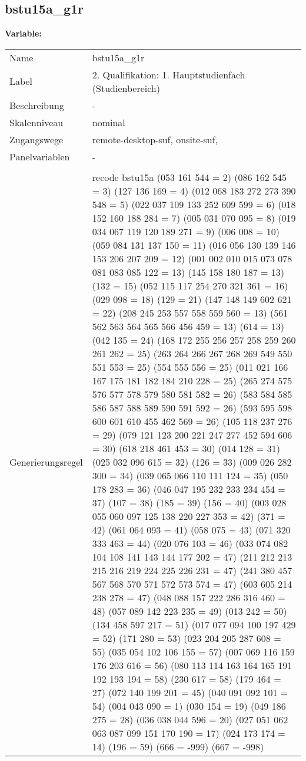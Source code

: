 	
	
	\subsection{bstu15a\_g1r}
	\label{subSection:bstu15a_g1r}

	\noindent\textbf{Variable:}\\
		\begin{tabular}{lL{11.3cm}}
			\label{tableVariable:bstu15a_g1r}
			Name & bstu15a\_g1r \\
			Label & 2. Qualifikation: 1. Hauptstudienfach (Studienbereich) \\
			Beschreibung & - \\
			Skalenniveau & nominal \\
			Zugangswege &
				remote-desktop-suf,
				onsite-suf,
 \\
			Panelvariablen & -
			 \\
			 \\
					Generierungsregel & recode bstu15a (053 161 544 = 2)  (086 162 545 = 3) (127 136 169 = 4) (012 068 183 272 273 390 548 = 5) (022 037 109 133 252 609 599 = 6) (018 152 160 188 284 = 7) (005 031 070 095 = 8) (019 034 067 119 120 189 271 = 9) (006 008 = 10) (059 084 131 137 150 = 11) (016 056 130 139 146 153 206 207 209   = 12) (001 002 010 015 073 078 081 083 085 122  = 13) (145 158 180 187 = 13) (132 = 15) (052 115 117 254 270 321 361 = 16) (029 098 = 18) (129 = 21) (147 148 149 602 621 = 22) (208 245 253 557 558 559 560 = 13) (561 562 563 564 565 566 456 459 = 13) (614 = 13) (042 135 = 24) (168 172 255 256 257 258 259 260 261 262  = 25) (263 264 266 267 268 269 549 550 551 553  = 25) (554 555 556 = 25) (011 021 166 167 175 181 182 184 210 228 = 25) (265 274 575 576 577 578 579 580 581 582 = 26) (583 584 585 586 587 588 589 590 591 592  = 26) (593 595 598 600 601 610 455 462 569 = 26) (105 118 237 276 = 29) (079 121 123 200 221 247 277 452 594 606 = 30) (618 218 461 453 = 30)  (014 128 = 31) (025 032 096 615 = 32) (126 = 33) (009 026 282 300 = 34) (039 065 066 110 111 124 = 35) (050 178 283 = 36) (046 047 195 232 233 234 454 = 37) (107 = 38)    (185 = 39) (156 = 40) (003 028 055 060 097 125 138 220 227 353 = 42)  (371 = 42)  (061 064 093 = 41) (058 075 = 43) (071 320 333 463 = 44)  (020 076 103 = 46) (033 074 082 104 108 141 143 144 177 202  = 47) (211 212 213 215 216 219 224 225 226 231  = 47) (241 380 457 567 568 570 571 572 573 574 = 47) (603 605 214 238 278 = 47) (048 088 157 222 286 316 460 = 48) (057 089 142 223 235 = 49) (013 242 = 50) (134 458 597 217 = 51) (017 077 094 100 197 429 = 52) (171 280 = 53) (023 204 205 287 608 = 55) (035 054 102 106 155 = 57) (007 069 116 159 176 203 616 = 56) (080 113 114 163 164 165 191 192 193 194  = 58) (230 617 = 58) (179 464 = 27) (072 140 199 201 = 45) (040 091 092 101 = 54) (004 043 090 = 1) (030 154 = 19) (049 186 275 = 28) (036 038 044 596 = 20) (027 051 062 063 087 099 151 170 190 = 17) (024 173 174 = 14) (196 = 59) (666 = -999) (667 = -998) 

\end{tabular}
